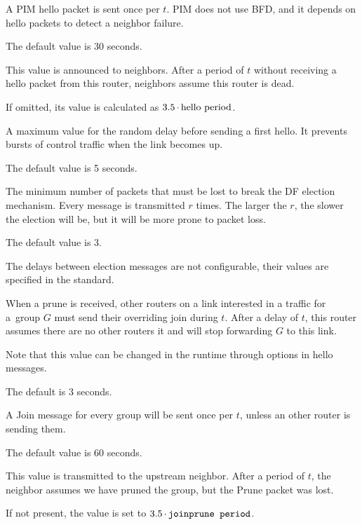 \begin{description}[style=nextline]
  A PIM hello packet is sent once per $t$. PIM does not use BFD, and it depends
  on hello packets to detect a neighbor failure.

  The default value is 30 seconds.

  This value is announced to neighbors. After a period of $t$ without receiving
  a hello packet from this router, neighbors assume this router is dead.

  If omitted, its value is calculated as $3.5\mathop{\cdot}\hbox{hello period}$.

  A maximum value for the random delay before sending a first hello. It
  prevents bursts of control traffic when the link becomes up.

  The default value is 5 seconds.

  The minimum number of packets that must be lost to break the DF election
  mechanism. Every message is transmitted $r$ times. The larger the $r$, the
  slower the election will be, but it will be more prone to packet loss.

  The default value is 3.

  The delays between election messages are not configurable, their values are
  specified in the standard.

  When a prune is received, other routers on a link interested in a traffic for
  a~group $G$ must send their overriding join during $t$. After a delay of $t$, this
  router assumes there are no other routers it and will stop forwarding $G$ to this
  link.

  Note that this value can be changed in the runtime through options in hello
  messages.

  The default is 3 seconds.

  A Join message for every group will be sent once per $t$, unless an other router
  is sending them.

  The default value is 60 seconds.

  This value is transmitted to the upstream neighbor. After a period of $t$,
  the neighbor assumes we have pruned the group, but the Prune packet was
  lost.

  If not present, the value is set to $3.5\mathop{\cdot}\texttt{joinprune period}$.
\end{description}

